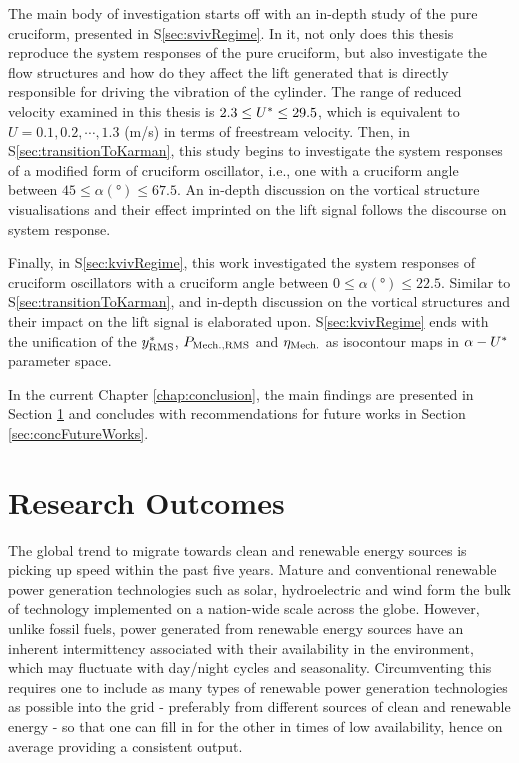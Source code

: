 \documentclass[oneside]{utmthesis}
\begin{document}
The main body of investigation starts off with an in-depth study of the pure cruciform, presented in S\ref{sec:svivRegime}. In it, not only does this thesis reproduce the system responses of the pure cruciform, but also investigate the flow structures and how do they affect the lift generated that is directly responsible for driving the vibration of the cylinder. The range of reduced velocity examined in this thesis is $2.3 \leq U^{*} \leq 29.5$, which is equivalent to $U = 0.1, 0.2, \cdots, 1.3$ (m/s) in terms of freestream velocity. Then, in S\ref{sec:transitionToKarman}, this study begins to investigate the system responses of a modified form of cruciform oscillator, i.e., one with a cruciform angle between $45 \leq \alpha (\si{\degree}) \leq 67.5$. An in-depth discussion on the vortical structure visualisations and their effect imprinted on the lift signal follows the discourse on system response.

Finally, in S\ref{sec:kvivRegime}, this work investigated the system responses of cruciform oscillators with a cruciform angle between $0 \leq \alpha (\si{\degree}) \leq 22.5$. Similar to S\ref{sec:transitionToKarman}, and in-depth discussion on the vortical structures and their impact on the lift signal is elaborated upon. S\ref{sec:kvivRegime} ends with the unification of the $y^{*}_{\text{RMS}}$, $P_{\text{Mech.,RMS}}$ and $\eta_{\text{Mech.}}$ as isocontour maps in $\alpha - U^{*}$ parameter space. 

In the current Chapter \ref{chap:conclusion}, the main findings are presented in Section \ref{sec:concResearchOutcome} and concludes with recommendations for future works in Section \ref{sec:concFutureWorks}.

\section{Research Outcomes} \label{sec:concResearchOutcome}
The global trend to migrate towards clean and renewable energy sources is picking up speed within the past five years. Mature and conventional renewable power generation technologies such as solar, hydroelectric and wind form the bulk of technology implemented on a nation-wide scale across the globe. However, unlike fossil fuels, power generated from renewable energy sources have an inherent intermittency associated with their availability in the environment, which may fluctuate with day/night cycles and seasonality. Circumventing this requires one to include as many types of renewable power generation technologies as possible into the grid - preferably from different sources of clean and renewable energy - so that one can fill in for the other in times of low availability, hence on average providing a consistent output.
\end{document}
